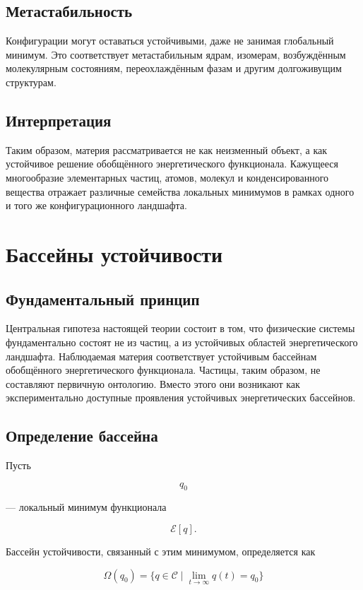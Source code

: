 \section{Метастабильность}

Конфигурации могут оставаться устойчивыми, даже не занимая глобальный минимум. Это соответствует метастабильным ядрам, изомерам, возбуждённым молекулярным состояниям, переохлаждённым фазам и другим долгоживущим структурам.

\section{Интерпретация}

Таким образом, материя рассматривается не как неизменный объект, а как устойчивое решение обобщённого энергетического функционала. Кажущееся многообразие элементарных частиц, атомов, молекул и конденсированного вещества отражает различные семейства локальных минимумов в рамках одного и того же конфигурационного ландшафта.

\chapter{Бассейны устойчивости}

\section{Фундаментальный принцип}

Центральная гипотеза настоящей теории состоит в том, что физические системы фундаментально состоят не из частиц, а из устойчивых областей энергетического ландшафта. Наблюдаемая материя соответствует устойчивым бассейнам обобщённого энергетического функционала. Частицы, таким образом, не составляют первичную онтологию. Вместо этого они возникают как экспериментально доступные проявления устойчивых энергетических бассейнов.

\section{Определение бассейна}

Пусть

\[ q_0 \]

— локальный минимум функционала

\[ \mathcal E[q]. \]

Бассейн устойчивости, связанный с этим минимумом, определяется как

\[ \boxed{ \Omega(q_0) = \{ q\in\mathcal C \;|\; \lim_{t\rightarrow\infty} q(t)=q_0 \} } \]

